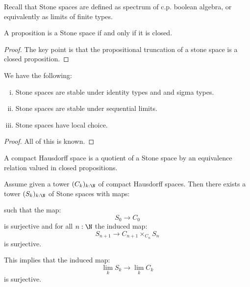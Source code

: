 Recall that Stone spaces are defined as spectrum of c.p. boolean algebra, or equivalently as limits of finite types.

\begin{lemma}
A proposition is a Stone space if and only if it is closed.
\end{lemma}

\begin{proof}
The key point is that the propositional truncation of a stone space is a closed proposition.
\end{proof}

\begin{theorem}
We have the following:
\begin{enumerate}[(i)]
\item Stone spaces are stable under identity types and and sigma types.
\item Stone spaces are stable under sequential limits.
\item Stone spaces have local choice.
\end{enumerate}
\end{theorem}

\begin{proof}
All of this is known.
\end{proof}

\begin{definition}
A compact Hausdorff space is a quotient of a Stone space by an equivalence relation valued in closed propositions.
\end{definition}

\begin{lemma}\label{sequential-limit-Hausdorff}
Assume given a tower $(C_k)_{k:\N}$ of compact Hausdorff spaces. Then there exists a tower $(S_k)_{k:\N}$ of Stone spaces with maps:

\begin{center}
\end{center}

such that the map:
\[S_0\to C_0\]
is surjective and for all $n:\N$ the induced map:
\[S_{n+1} \to C_{n+1}\times_{C_n} S_n\]
is surjective.

This implies that the induced map:
\[\lim_kS_k \to \lim_k C_k\]
is surjective.
\end{lemma}


